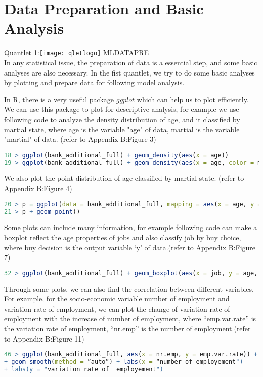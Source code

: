 \documentclass[12pt, a4paper, bibliography=totoc, english]{scrartcl}
\begin{document}
\section{Data Preparation and Basic Analysis}\label{DPBA}
Quantlet 1:\texttt{[image: qletlogo]}
\textcolor{blue}{\href{https://github.com/JingyiLiu3136/MLFBM/tree/master/MLDATAPRE}{MLDATAPRE}}\vspace{3mm}\\
In any statistical issue, the preparation of data is a essential step, and some basic analyses are also necessary. In the fist quantlet, we try to do some basic analyses by plotting and prepare data for following model analysis.

In R, there is a very useful package $ggplot$ which can help us to plot efficiently. We can use this package to plot for descriptive analysis, for example we use following code to analyze the density distribution of age, and it classified by martial state, where age is the variable "age" of data, martial is the variable "martial" of data. (refer to Appendix B:Figure 3)

\begin{lstlisting}[language = R]
18 > ggplot(bank_additional_full) + geom_density(aes(x = age))
19 > ggplot(bank_additional_full) + geom_density(aes(x = age, color = marital))
\end{lstlisting}

We also plot the point distribution of age classified by martial state. (refer to Appendix B:Figure 4)


\begin{lstlisting}[language = R]
20 > p = ggplot(data = bank_additional_full, mapping = aes(x = age, y = marital))
21 > p + geom_point()  
\end{lstlisting}

Some plots can include many information, for example following code can make a boxplot reflect the age properties of jobs and also classify job by buy choice, where buy decision is the output variable `y' of data.(refer to Appendix B:Figure 7)

\begin{lstlisting}[language = R]
32 > ggplot(bank_additional_full) + geom_boxplot(aes(x = job, y = age, fill = buy))
\end{lstlisting}

Through some plots, we can also find the correlation between different variables. For example, for the socio-economic variable number of employment and variation rate of employment, we can plot the change of variation rate of employment with the increase of number of employment, where “emp.var.rate” is the variation rate of employment, “nr.emp” is the number of employment.(refer to Appendix B:Figure 11)
\begin{lstlisting}[language = R]
46 > ggplot(bank_additional_full, aes(x = nr.emp, y = emp.var.rate)) + geom_point() 
+ geom_smooth(method = ”auto“) + labs(x = “number of employement") 
+ labs(y = "variation rate of  employement")
\end{lstlisting}
\end{document}
